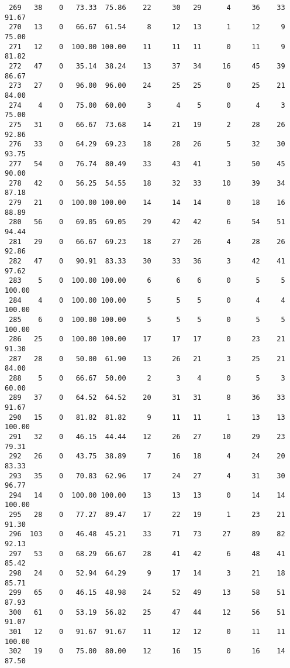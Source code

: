 \begin{verbatim}
 269   38    0   73.33  75.86    22     30   29      4     36    33    91.67
 270   13    0   66.67  61.54     8     12   13      1     12     9    75.00
 271   12    0  100.00 100.00    11     11   11      0     11     9    81.82
 272   47    0   35.14  38.24    13     37   34     16     45    39    86.67
 273   27    0   96.00  96.00    24     25   25      0     25    21    84.00
 274    4    0   75.00  60.00     3      4    5      0      4     3    75.00
 275   31    0   66.67  73.68    14     21   19      2     28    26    92.86
 276   33    0   64.29  69.23    18     28   26      5     32    30    93.75
 277   54    0   76.74  80.49    33     43   41      3     50    45    90.00
 278   42    0   56.25  54.55    18     32   33     10     39    34    87.18
 279   21    0  100.00 100.00    14     14   14      0     18    16    88.89
 280   56    0   69.05  69.05    29     42   42      6     54    51    94.44
 281   29    0   66.67  69.23    18     27   26      4     28    26    92.86
 282   47    0   90.91  83.33    30     33   36      3     42    41    97.62
 283    5    0  100.00 100.00     6      6    6      0      5     5   100.00
 284    4    0  100.00 100.00     5      5    5      0      4     4   100.00
 285    6    0  100.00 100.00     5      5    5      0      5     5   100.00
 286   25    0  100.00 100.00    17     17   17      0     23    21    91.30
 287   28    0   50.00  61.90    13     26   21      3     25    21    84.00
 288    5    0   66.67  50.00     2      3    4      0      5     3    60.00
 289   37    0   64.52  64.52    20     31   31      8     36    33    91.67
 290   15    0   81.82  81.82     9     11   11      1     13    13   100.00
 291   32    0   46.15  44.44    12     26   27     10     29    23    79.31
 292   26    0   43.75  38.89     7     16   18      4     24    20    83.33
 293   35    0   70.83  62.96    17     24   27      4     31    30    96.77
 294   14    0  100.00 100.00    13     13   13      0     14    14   100.00
 295   28    0   77.27  89.47    17     22   19      1     23    21    91.30
 296  103    0   46.48  45.21    33     71   73     27     89    82    92.13
 297   53    0   68.29  66.67    28     41   42      6     48    41    85.42
 298   24    0   52.94  64.29     9     17   14      3     21    18    85.71
 299   65    0   46.15  48.98    24     52   49     13     58    51    87.93
 300   61    0   53.19  56.82    25     47   44     12     56    51    91.07
 301   12    0   91.67  91.67    11     12   12      0     11    11   100.00
 302   19    0   75.00  80.00    12     16   15      0     16    14    87.50

\end{verbatim}
